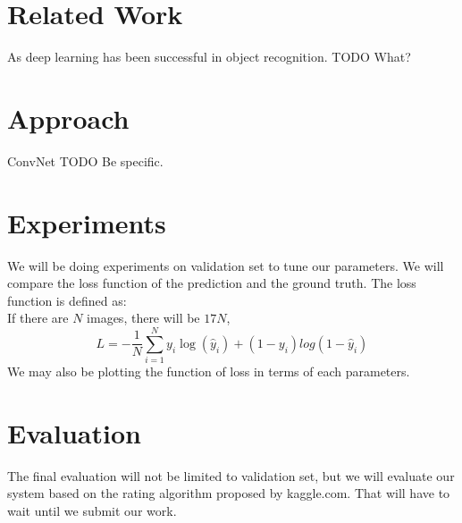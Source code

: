 \documentclass[conference,compsoc]{IEEEtran}
\begin{document}
\section{Related Work}
	As deep learning has been successful in object recognition. 
	TODO What?
\section{Approach}
	ConvNet
	TODO Be specific.
\section{Experiments}
	We will be doing experiments on validation set to tune our parameters. We will compare the loss function of the prediction and the ground truth. The loss function is defined as: \\
	If there are $N$ images, there will be $17N$,
	$$ L = -\frac{1}{N}\sum_{i=1}^N{y_i\log(\hat{y}_i) + (1-y_i)log(1-\hat{y}_i)}$$
	We may also be plotting the function of loss in terms of each parameters.
\section{Evaluation}
	The final evaluation will not be limited to validation set, but we will evaluate our system based on the rating algorithm proposed by kaggle.com. That will have to wait until we submit our work.




%
\end{document}
